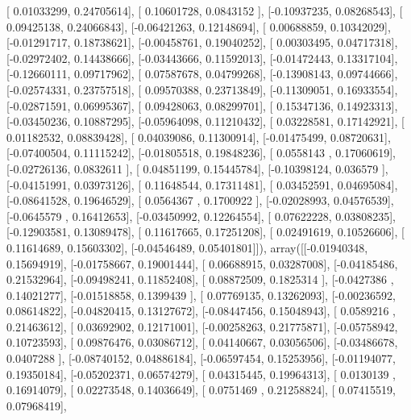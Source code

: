 \documentclass{article}
\begin{document}
       [ 0.01033299,  0.24705614],
       [ 0.10601728,  0.0843152 ],
       [-0.10937235,  0.08268543],
       [ 0.09425138,  0.24066843],
       [-0.06421263,  0.12148694],
       [ 0.00688859,  0.10342029],
       [-0.01291717,  0.18738621],
       [-0.00458761,  0.19040252],
       [ 0.00303495,  0.04717318],
       [-0.02972402,  0.14438666],
       [-0.03443666,  0.11592013],
       [-0.01472443,  0.13317104],
       [-0.12660111,  0.09717962],
       [ 0.07587678,  0.04799268],
       [-0.13908143,  0.09744666],
       [-0.02574331,  0.23757518],
       [ 0.09570388,  0.23713849],
       [-0.11309051,  0.16933554],
       [-0.02871591,  0.06995367],
       [ 0.09428063,  0.08299701],
       [ 0.15347136,  0.14923313],
       [-0.03450236,  0.10887295],
       [-0.05964098,  0.11210432],
       [ 0.03228581,  0.17142921],
       [ 0.01182532,  0.08839428],
       [ 0.04039086,  0.11300914],
       [-0.01475499,  0.08720631],
       [-0.07400504,  0.11115242],
       [-0.01805518,  0.19848236],
       [ 0.0558143 ,  0.17060619],
       [-0.02726136,  0.0832611 ],
       [ 0.04851199,  0.15445784],
       [-0.10398124,  0.036579  ],
       [-0.04151991,  0.03973126],
       [ 0.11648544,  0.17311481],
       [ 0.03452591,  0.04695084],
       [-0.08641528,  0.19646529],
       [ 0.0564367 ,  0.1700922 ],
       [-0.02028993,  0.04576539],
       [-0.0645579 ,  0.16412653],
       [-0.03450992,  0.12264554],
       [ 0.07622228,  0.03808235],
       [-0.12903581,  0.13089478],
       [ 0.11617665,  0.17251208],
       [ 0.02491619,  0.10526606],
       [ 0.11614689,  0.15603302],
       [-0.04546489,  0.05401801]]), array([[-0.01940348,  0.15694919],
       [-0.01758667,  0.19001444],
       [ 0.06688915,  0.03287008],
       [-0.04185486,  0.21532964],
       [-0.09498241,  0.11852408],
       [ 0.08872509,  0.1825314 ],
       [-0.0427386 ,  0.14021277],
       [-0.01518858,  0.1399439 ],
       [ 0.07769135,  0.13262093],
       [-0.00236592,  0.08614822],
       [-0.04820415,  0.13127672],
       [-0.08447456,  0.15048943],
       [ 0.0589216 ,  0.21463612],
       [ 0.03692902,  0.12171001],
       [-0.00258263,  0.21775871],
       [-0.05758942,  0.10723593],
       [ 0.09876476,  0.03086712],
       [ 0.04140667,  0.03056506],
       [-0.03486678,  0.0407288 ],
       [-0.08740152,  0.04886184],
       [-0.06597454,  0.15253956],
       [-0.01194077,  0.19350184],
       [-0.05202371,  0.06574279],
       [ 0.04315445,  0.19964313],
       [ 0.0130139 ,  0.16914079],
       [ 0.02273548,  0.14036649],
       [ 0.0751469 ,  0.21258824],
       [ 0.07415519,  0.07968419],
\end{document}
